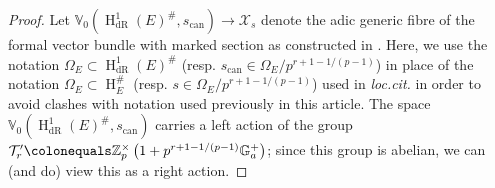 \documentclass[10pt, oneside]{amsart}
\newcommand{\defeq}{\colonequals}
\numberwithin{equation}{subsection}
\theoremstyle{definition}
\theoremstyle{remark}
\newcommand{\mbb}[1]{\mathbb{#1}}
\newcommand{\opn}[1]{\operatorname{#1}}
\begin{document}
\begin{proof}
Let $\mbb{V}_0(\opn{H}^1_{\opn{dR}}(E)^{\#}, s_{\opn{can}}) \to \mathcal{X}_s$ denote the adic generic fibre of the formal vector bundle with marked section as constructed in \cite[\S 3.3]{AI_LLL}. Here, we use the notation $\Omega_E \subset \opn{H}^1_{\opn{dR}}(E)^{\#}$ (resp. $s_{\opn{can}} \in \Omega_E/p^{r+1-1/(p-1)}$) in place of the notation $\Omega_E \subset \opn{H}_E^{\#}$ (resp. $s \in \Omega_E/p^{r+1-1/(p-1)}$) used in \emph{loc.cit.} in order to avoid clashes with notation used previously in this article. The space $\mbb{V}_0(\opn{H}^1_{\opn{dR}}(E)^{\#}, s_{\opn{can}})$ carries a left action of the group $\mathcal{T}_r' \defeq \mbb{Z}_p^{\times} \left( 1 + p^{r+1-1/(p-1)}\mbb{G}_a^+ \right)$; since this group is abelian, we can (and do) view this as a right action.


\end{proof}
\end{document}
